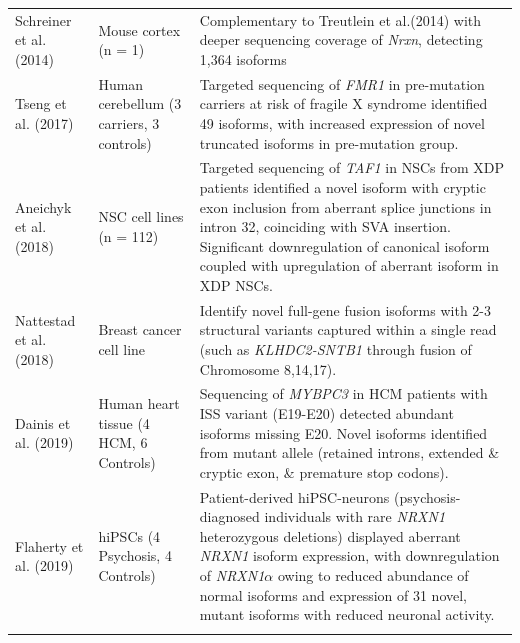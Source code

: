 \begin{landscape}
\begin{longtable}[c]{p{4cm}p{4cm}p{18cm}}
		\centering Schreiner et al. (2014)\cite{Schreiner2014} &
		\centering Mouse cortex (n = 1) &
		\tabitem Complementary to Treutlein et al.(2014) with deeper sequencing coverage of \textit{Nrxn}, detecting 1,364 isoforms\\
		\hdashline[0.5pt/5pt]
		
		\centering Tseng et al. (2017) \cite{Tseng2017} &
		\centering Human cerebellum \newline (3 carriers, 3 controls)  &
		\tabitem Targeted sequencing of \textit{FMR1} in pre-mutation carriers at risk of fragile X syndrome identified 49 isoforms, with increased expression of novel truncated isoforms in pre-mutation group. \\
		\hdashline[0.5pt/5pt]	
		
		\centering Aneichyk et al. (2018) \cite{Aneichyk2018} &
		\centering NSC cell lines (n = 112)  &
		\tabitem Targeted sequencing of \textit{TAF1} in NSCs from XDP patients identified a novel isoform with cryptic exon inclusion from aberrant splice junctions in intron 32, coinciding with SVA insertion. \newline
		\tabitem Significant downregulation of canonical isoform coupled with upregulation of aberrant isoform in XDP NSCs.\\
		\hdashline[0.5pt/5pt]	
		
		\centering Nattestad et al. (2018) \cite{Nattestad2018} &
		\centering Breast cancer cell line  &
		\tabitem Identify novel full-gene fusion isoforms with 2-3 structural variants captured within a single read (such as \textit{KLHDC2-SNTB1} through fusion of Chromosome 8,14,17). \\			
		
		\centering Dainis et al. (2019) \cite{Dainis2019} &
		\centering Human heart tissue (4 HCM, 6 Controls) &
		\tabitem Sequencing of \textit{MYBPC3} in HCM patients with ISS variant (E19-E20) detected abundant isoforms missing E20. \newline
		\tabitem Novel isoforms identified from mutant allele (retained introns, extended \& cryptic exon, \& premature stop codons).  \\
		
		\centering Flaherty et al. (2019) \cite{Flaherty2019} &
		\centering hiPSCs \newline (4 Psychosis, 4 Controls)  &
		\tabitem Patient-derived hiPSC-neurons (psychosis-diagnosed individuals with rare \textit{NRXN1} heterozygous deletions) displayed aberrant \textit{NRXN1} isoform expression, with downregulation of \textit{NRXN1$\alpha$} owing to reduced abundance of normal isoforms and expression of 31 novel, mutant isoforms with reduced neuronal activity.  \\
		\hdashline[0.5pt/5pt]
		

\end{longtable}
\end{landscape}
